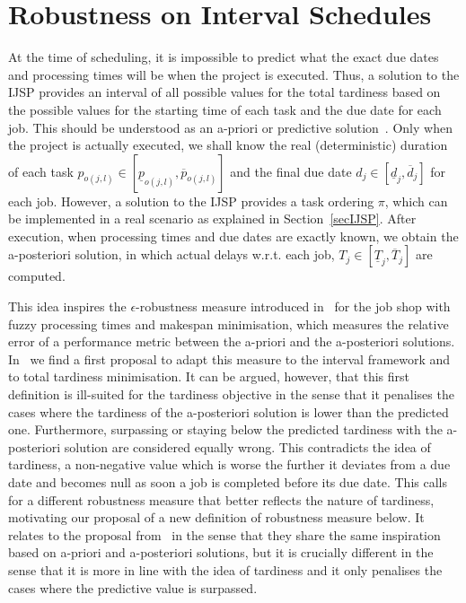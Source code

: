 \documentclass[12pt,halfline,a4paper]{ouparticle}
\begin{document}
\section{Robustness on Interval Schedules}\label{secRobustness}
At the time of scheduling, it is impossible to predict what the exact due dates and processing times will be when the project is executed. Thus, a solution to the IJSP provides an interval of all possible values for the total tardiness based on the possible values for the starting time of each task and the due date for each job. This should be understood as an a-priori or predictive solution~\cite{GonzalezRodriguez2008}. Only when the project is actually executed, we shall know the real (deterministic) duration of each task $p_{o(j,l)} \in [\underline{p}_{o(j,l)}, \overline{p}_{o(j,l)}]$ and the final due date $d_j \in [\underline{d}_j, \overline{d}_j]$ for each job. However, a solution to the IJSP provides a task ordering $\pi$, which can be implemented in a real scenario as explained in Section~\ref{secIJSP}. After execution, when processing times and due dates are exactly known, we obtain the a-posteriori solution, in which actual delays w.r.t. each job, $T_j \in [\underline{T}_j, \overline{T}_j]$ are computed. 

This idea inspires the $\epsilon$-robustness measure introduced in~\cite{Palacios2014} for the job shop with fuzzy processing times and makespan minimisation, which measures the relative error of a performance metric between the a-priori and the a-posteriori solutions. In~\cite{Diaz2020} we find a first proposal to adapt this measure to the interval framework and to total tardiness minimisation.  It can be argued, however, that this first definition is ill-suited for the tardiness objective in the sense that it penalises the cases where the tardiness of the a-posteriori solution is lower than the predicted one.  Furthermore, surpassing or staying below the predicted tardiness with the a-posteriori solution are considered equally wrong. This contradicts the idea of tardiness, a non-negative value which is worse the further it deviates from a due date and becomes null as soon a job is completed before its due date.  This calls for a different robustness measure that better reflects the nature of tardiness, motivating our proposal of a new definition of robustness measure below. It relates to the proposal from~\cite{Diaz2020} in the sense that they share the same inspiration based on a-priori and a-posteriori solutions, but it is crucially different in the sense that it is more in line with the idea of tardiness and it only penalises the cases where the predictive value is surpassed.
\end{document}
